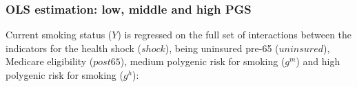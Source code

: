 %
%
%


\subsubsection{OLS estimation: low, middle and high PGS} \label{appsec:derivation3split}
	Current smoking status ($Y$) is regressed on the full set of interactions between the indicators for the health shock ($shock$), being uninsured pre-65 ($uninsured$), Medicare eligibility ($post65$), medium polygenic risk for smoking ($g^m$) and high polygenic risk for smoking ($g^h$):

